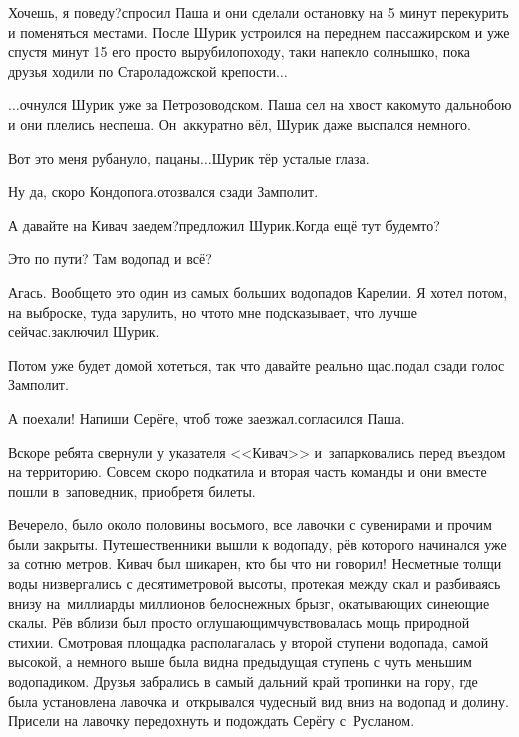 \diagdash Хочешь, я поведу?\mdash спросил Паша и они сделали остановку на 5 минут перекурить и поменяться местами. После Шурик устроился на переднем пассажирском и уже спустя минут 15 его просто вырубило\mdash походу, таки напекло солнышко, пока друзья ходили по Староладожской крепости$\ldots$

\vspace{0.5cm}

$\ldots$очнулся Шурик уже за Петрозоводском. Паша сел на хвост какому\sdash то дальнобою и они плелись неспеша. Он~аккуратно вёл, Шурик даже выспался немного.

\diagdash Вот это меня рубануло, пацаны$\ldots$\mdash Шурик тёр усталые глаза.

\diagdash Ну да, скоро Кондопога.\mdash отозвался сзади Замполит.

\diagdash А давайте на Кивач заедем?\mdash предложил Шурик.\mdash Когда ещё тут будем\sdash то?

\diagdash Это по пути? Там водопад и всё?

\diagdash Агась. Вообще\sdash то это один из самых больших водопадов Карелии. Я хотел потом, на выброске, туда зарулить, но что\sdash то мне подсказывает, что лучше сейчас.\mdash заключил Шурик.

\diagdash Потом уже будет домой хотеться, так что давайте реально щас.\mdash подал сзади голос Замполит.

\diagdash А поехали! Напиши Серёге, чтоб тоже заезжал.\mdash согласился Паша.

Вскоре ребята свернули у указателя <<Кивач>> и~запарковались перед въездом на территорию. Совсем скоро подкатила и вторая часть команды и они вместе пошли в~заповедник, приобретя билеты.

Вечерело, было около половины восьмого, все лавочки с сувенирами и прочим были закрыты. Путешественники вышли к водопаду, рёв которого начинался уже за сотню метров. Кивач был шикарен, кто бы что ни говорил! Несметные толщи воды низвергались с десятиметровой высоты, протекая между скал и разбиваясь внизу на~миллиарды миллионов белоснежных брызг, окатывающих синеющие скалы. Рёв вблизи был просто оглушающим\mdash чувствовалась мощь природной стихии. Смотровая площадка располагалась у второй ступени водопада, самой высокой, а немного выше была видна предыдущая ступень с чуть меньшим водопадиком. Друзья забрались в самый дальний край тропинки на гору, где была установлена лавочка и~открывался чудесный вид вниз на водопад и долину. Присели на лавочку передохнуть и подождать Серёгу с~Русланом. 

